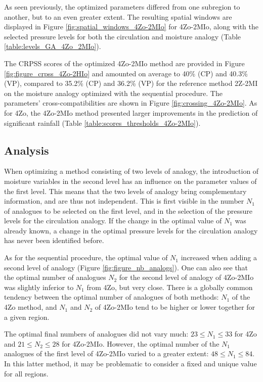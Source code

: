 \documentclass[review]{elsarticle}
\begin{document}
As seen previously, the optimized parameters differed from one subregion to another, but to an even greater extent. The resulting spatial windows are displayed in Figure \ref{fig:spatial_windows_4Zo-2MIo} for 4Zo-2MIo, along with the selected pressure levels for both the circulation and moisture analogy (Table \ref{table:levels_GA_4Zo_2MIo}). 

The CRPSS scores of the optimized 4Zo-2MIo method are provided in Figure \ref{fig:figure_crpss_4Zo-2HIo} and amounted on average to 40\% (CP) and 40.3\% (VP), compared to 35.2\% (CP) and 36.2\% (VP) for the reference method 2Z-2MI on the moisture analogy optimized with the sequential procedure. The parameters’ cross-compatibilities are shown in Figure \ref{fig:crossing_4Zo-2MIo}. As for 4Zo, the 4Zo-2MIo method presented larger improvements in the prediction of significant rainfall (Table \ref{table:scores_thresholds_4Zo-2MIo}).


\subsection{Analysis}

When optimizing a method consisting of two levels of analogy, the introduction of moisture variables in the second level has an influence on the parameter values of the first level. This means that the two levels of analogy bring complementary information, and are thus not independent. This is first visible in the number $N_{1}$ of analogues to be selected on the first level, and in the selection of the pressure levels for the circulation analogy. If the change in the optimal value of $N_{1}$ was already known, a change in the optimal pressure levels for the circulation analogy has never been identified before.

As for the sequential procedure, the optimal value of $N_{1}$ increased when adding a second level of analogy (Figure \ref{fig:figure_nb_analogs}). One can also see that the optimal number of analogues $N_{2}$ for the second level of analogy of 4Zo-2MIo was slightly inferior to $N_{1}$ from 4Zo, but very close. There is a globally common tendency between the optimal number of analogues of both methods: $N_{1}$ of the 4Zo method, and $N_{1}$ and $N_{2}$ of 4Zo-2MIo tend to be higher or lower together for a given region.

The optimal final numbers of analogues did not vary much: $23 \leq N_{1} \leq 33$ for 4Zo and $21 \leq N_{2} \leq 28$ for 4Zo-2MIo. However, the optimal number of the $N_{1}$ analogues of the first level of 4Zo-2MIo varied to a greater extent: $48 \leq N_{1} \leq 84$. In this latter method, it may be problematic to consider a fixed and unique value for all regions.
\end{document}
